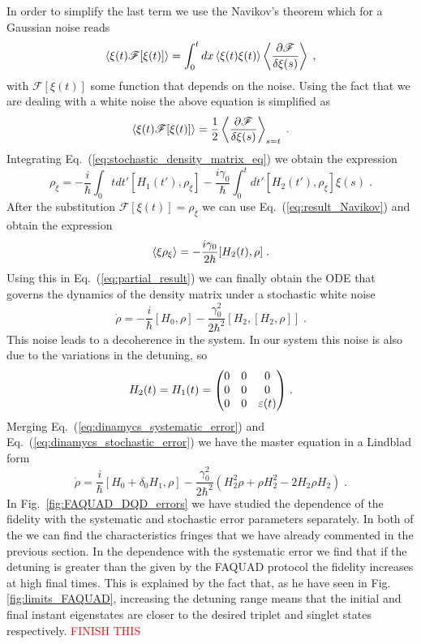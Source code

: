 \documentclass[a4paper,11pt]{article}
\begin{document}
In order to simplify the last term we use the Navikov's theorem which for a Gaussian noise reads
\begin{equation}
	\expval{\xi(t)\mathscr{F}[\xi(t)]}=\int_0^t dx\expval{\xi(t)\xi(t)}\expval{\frac{\partial \mathscr{F}}{\delta \xi(s)}}\;,
\end{equation}
with $\mathscr{F}[\xi(t)]$ some function that depends on the noise. Using the fact that we are dealing with a white noise the above equation is simplified as
\begin{equation}
	\expval{\xi(t)\mathscr{F}[\xi(t)]}=\frac{1}{2}\expval{\frac{\partial \mathscr{F}}{\delta \xi(s)}}_{s=t}\; .
	\label{eq:result_Navikov}
\end{equation}
Integrating Eq.~(\ref{eq:stochastic_density_matrix_eq}) we obtain the expression
\begin{equation}
	\rho_\xi=-\frac{i}{\hbar}\int_0t dt'[H_1(t'),\rho_\xi]-\frac{i\gamma_0}{\hbar}\int_0^t dt'[H_2(t'),\rho_\xi]\xi(s)\; .
\end{equation}
After the substitution $\mathscr{F}[\xi(t)]=\rho_\xi$ we can use Eq.~(\ref{eq:result_Navikov}) and obtain the expression
\begin{equation}
	\expval{\xi\rho_\xi}=-\frac{i\gamma_0}{2\hbar}[H_2(t),\rho]\; .
\end{equation}
Using this in Eq.~(\ref{eq:partial_result}) we can finally obtain the ODE that governs the dynamics of the density matrix under a stochastic white noise
\begin{equation}
	\dot{\rho}=-\frac{i}{\hbar}[H_0,\rho]-\frac{\gamma_0^2}{2\hbar^2}[H_2,[H_2,\rho]]\; .
	\label{eq:dinamycs_stochastic_error}
\end{equation}
This noise leads to a decoherence in the system. In our system this noise is also due to the variations in the detuning, so
\begin{equation}
	H_2(t)=H_1(t)=\mqty(0 & 0 & 0 \\ 0 & 0 & 0 \\ 0 & 0 & \varepsilon(t))\; .
\end{equation}
 Merging Eq.~(\ref{eq:dinamycs_systematic_error}) and Eq.~(\ref{eq:dinamycs_stochastic_error}) we have the master equation in a Lindblad form
\begin{equation}
	\dot{\rho}=\frac{i}{\hbar}[H_0+\delta_0H_1,\rho]-\frac{\gamma_0^2}{2\hbar^2}\left(H_2^2\rho+\rho H_2^2-2H_2\rho H_2\right)\; .
\end{equation}
In Fig.~\ref{fig:FAQUAD_DQD_errors} we have studied the dependence of the fidelity with the systematic and stochastic error parameters separately. In both of the we can find the characteristics fringes that we have already commented in the previous section. In the dependence with the systematic error we find that if the detuning is greater than the given by the FAQUAD protocol the fidelity increases at high final times. This is explained by the fact that, as he have seen in Fig.~ \ref{fig:limits_FAQUAD}, increasing the detuning range means that the initial and final instant eigenstates are closer to the desired triplet and singlet states respectively. \textcolor{red}{FINISH THIS}
\end{document}
